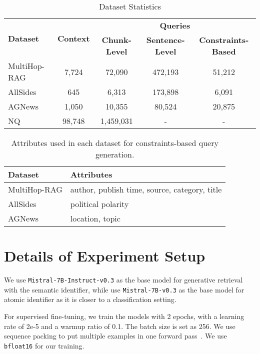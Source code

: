 \begin{table*}[htbp]
    \small
    \centering
    \begin{tabular}{lcccc}
    \toprule
    \multirow{2}{1cm}{\textbf{Dataset}} & \multirow{2}{1.1cm}{\textbf{Context}} & \multicolumn{3}{c}{\textbf{Queries}} \\
     & &\textbf{Chunk-Level} & \textbf{Sentence-Level} & \textbf{Constraints-Based}\\\midrule
     MultiHop-RAG & 7,724 & 72,090 & 472,193 & 51,212\\
     AllSides & 645 & 6,313 & 173,898 & 6,091 \\
     AGNews & 1,050 & 10,355 & 80,524 & 20,875 \\
     NQ & 98,748 & 1,459,031 & - & - \\\bottomrule %
    \end{tabular}
    \caption{Dataset Statistics}
    \label{tab:dataset_stats}
\end{table*}

\begin{table}[htbp]
    \small
    \centering
    \begin{tabular}{lp{4.8cm}}
    \toprule
      \textbf{Dataset} & \textbf{Attributes} \\\midrule
        MultiHop-RAG & author, publish time, source, category, title \\
        AllSides & political polarity \\
        AGNews & location, topic \\\bottomrule
    \end{tabular}
    \caption{Attributes used in each dataset for constraints-based query generation.}
    \label{tab:dataset_attributes}
\end{table}

\section{Details of Experiment Setup}
We use \texttt{Mistral-7B-Instruct-v0.3} as the base model for generative retrieval with the semantic identifier, while use \texttt{Mistral-7B-v0.3} as the base model for atomic identifier as it is closer to a classification setting.

For supervised fine-tuning, we train the models with 2 epochs, with a learning rate of 2e-5 and a warmup ratio of 0.1. The batch size is set as 256. We use sequence packing to put multiple examples in one forward pass~\citep{DBLP:journals/jmlr/RaffelSRLNMZLL20}. We use \texttt{bfloat16} for our training.

